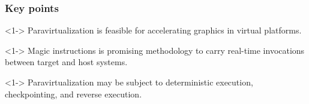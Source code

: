 
\begin{frame}
\frametitle{Key points}

\begin{thm}<1->
	Paravirtualization is feasible for accelerating graphics in virtual platforms.
\end{thm}

\begin{thm}<1->
	Magic instructions is promising methodology to carry real-time invocations between target and host systems.
\end{thm}

\begin{thm}<1->
	Paravirtualization may be subject to deterministic execution, checkpointing, and reverse execution.
\end{thm}

\end{frame}
